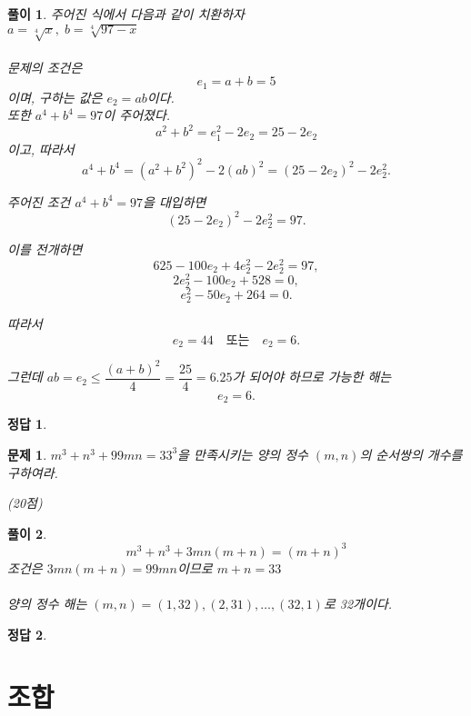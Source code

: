 \documentclass[12pt,a4paper]{article}
\theoremstyle{test_form}
\newtheorem{problem}{문제}[section]
\newtheorem*{solution}{풀이}
\newtheorem*{answer}{정답}
\begin{document}
\begin{solution}
    \setlength{\parindent}{0pt}
    주어진 식에서 다음과 같이 치환하자 \\
    $a=\sqrt[4]{x},\; b=\sqrt[4]{97-x}$
    \\\\
    문제의 조건은
    \[
    e_1 = a+b = 5
    \]
    이며, 구하는 값은 $e_2 = ab$이다.
    \\
    또한 $a^4+b^4=97$이 주어졌다.
    \[
    a^2+b^2 = e_1^2 - 2e_2 = 25 - 2e_2
    \]
    이고, 따라서
    \[
    a^4+b^4 = (a^2+b^2)^2 - 2(ab)^2 = (25-2e_2)^2 - 2e_2^2.
    \]
    
    주어진 조건 $a^4+b^4=97$을 대입하면
    \[
    (25-2e_2)^2 - 2e_2^2 = 97.
    \]
    
    이를 전개하면
    \[
    625 - 100e_2 + 4e_2^2 - 2e_2^2 = 97,
    \]
    \[
    2e_2^2 - 100e_2 + 528 = 0,
    \]
    \[
    e_2^2 - 50e_2 + 264 = 0.
    \]
    
    따라서
    \[
    e_2 = 44 \quad \text{또는} \quad e_2 = 6.
    \]
    
    그런데 $ab=e_2 \leq \dfrac{(a+b)^2}{4} = \dfrac{25}{4}=6.25$가 되어야 하므로 가능한 해는
    \[
    e_2 = 6.
    \]
    
\end{solution}
        
\begin{answer}
\hfill {}
\end{answer}

\newpage

\begin{problem}
\(m^{3}+n^{3}+99mn=33^{3}\)을 만족시키는 양의 정수 \((m,n)\)의 순서쌍의 개수를 구하여라.
\begin{flushright}(20점)\end{flushright}
\end{problem}

   
\begin{solution}
\setlength{\parindent}{0pt}
\[
m^3+n^3+3mn(m+n)=(m+n)^3
\]
조건은 \(3mn(m+n)=99mn\)이므로 \(m+n=33\) \\
\\양의 정수 해는 \((m,n)=(1,32),(2,31),\ldots,(32,1)\)로 32개이다.
\end{solution}

\begin{answer}
\hfill {}
\end{answer}

\newpage
\section{조합}
\end{document}
